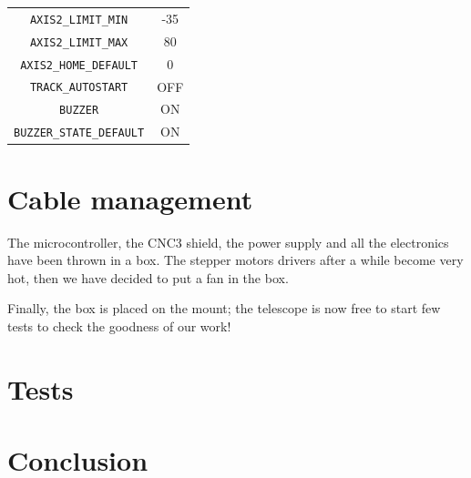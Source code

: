 \documentclass{article}
\begin{document}
\begin{multicols}{2}
\begin{minipage}
\begin{tabular}{cc}
                \texttt{AXIS2\_LIMIT\_MIN} & -35 \\
                \texttt{AXIS2\_LIMIT\_MAX} & 80 \\
                \texttt{AXIS2\_HOME\_DEFAULT} & 0\\
                \texttt{TRACK\_AUTOSTART} & OFF \\
                \texttt{BUZZER} & ON \\
                \texttt{BUZZER\_STATE\_DEFAULT} & ON\\
            \end{tabular}
            \label{fig:config_h}
        \end{minipage}

        \section{Cable management}
        The microcontroller, the CNC3 shield, the power supply and all the electronics have been thrown in a box.
        The stepper motors drivers after a while become very hot, then we have decided to put a fan in the box.

        Finally, the box is placed on the mount;
        the telescope is now free to start few tests to check the goodness of our work!

        \section{Tests}

        \section{Conclusion}

    \end{multicols}
\end{document}
